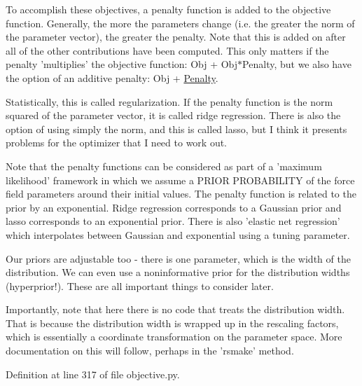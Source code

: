 To accomplish these objectives, a penalty function is added to the objective function. Generally, the more the parameters change (i.\-e. the greater the norm of the parameter vector), the greater the penalty. Note that this is added on after all of the other contributions have been computed. This only matters if the penalty 'multiplies' the objective function\-: Obj + Obj$\ast$\-Penalty, but we also have the option of an additive penalty\-: Obj + \hyperlink{classforcebalance_1_1objective_1_1Penalty}{Penalty}.

Statistically, this is called regularization. If the penalty function is the norm squared of the parameter vector, it is called ridge regression. There is also the option of using simply the norm, and this is called lasso, but I think it presents problems for the optimizer that I need to work out.

Note that the penalty functions can be considered as part of a 'maximum likelihood' framework in which we assume a P\-R\-I\-O\-R P\-R\-O\-B\-A\-B\-I\-L\-I\-T\-Y of the force field parameters around their initial values. The penalty function is related to the prior by an exponential. Ridge regression corresponds to a Gaussian prior and lasso corresponds to an exponential prior. There is also 'elastic net regression' which interpolates between Gaussian and exponential using a tuning parameter.

Our priors are adjustable too -\/ there is one parameter, which is the width of the distribution. We can even use a noninformative prior for the distribution widths (hyperprior!). These are all important things to consider later.

Importantly, note that here there is no code that treats the distribution width. That is because the distribution width is wrapped up in the rescaling factors, which is essentially a coordinate transformation on the parameter space. More documentation on this will follow, perhaps in the 'rsmake' method. 

Definition at line 317 of file objective.\-py.



